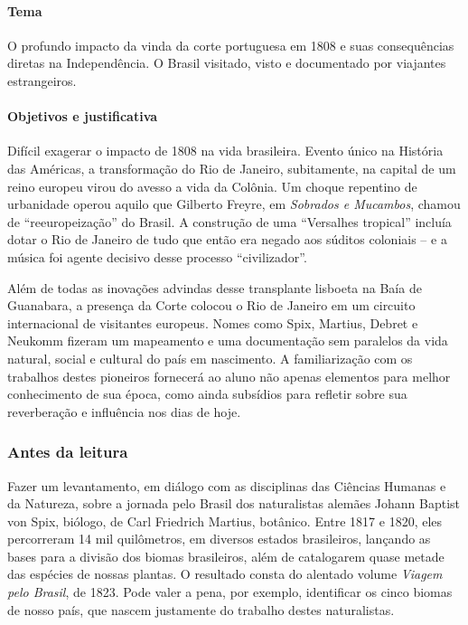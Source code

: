 \documentclass[11pt]{extarticle}
\begin{document}
\paragraph{Tema} O profundo impacto da vinda da corte portuguesa em 1808 e suas
consequências diretas na Independência. O Brasil visitado, visto e documentado
por viajantes estrangeiros. 

 

\paragraph{Objetivos e justificativa}

Difícil exagerar o impacto de 1808 na vida brasileira. Evento único na História
das Américas, a transformação do Rio de Janeiro, subitamente, na capital de um
reino europeu virou do avesso a vida da Colônia. Um choque repentino de
urbanidade operou aquilo que Gilberto Freyre, em \emph{Sobrados e Mucambos}, chamou de
“reeuropeização” do Brasil. A construção de uma “Versalhes tropical” incluía
dotar o Rio de Janeiro de tudo que então era negado aos súditos coloniais –  e
a música foi agente decisivo desse processo “civilizador”.

Além de todas as inovações advindas desse transplante lisboeta na Baía de
Guanabara, a presença da Corte colocou o Rio de Janeiro em um circuito
internacional de visitantes europeus. Nomes como Spix, Martius, Debret e
Neukomm fizeram um mapeamento e uma documentação sem paralelos da vida natural,
social e cultural do país em nascimento. A familiarização com os trabalhos
destes pioneiros fornecerá ao aluno não apenas elementos para melhor
conhecimento de sua época, como ainda subsídios para refletir sobre sua
reverberação e influência nos dias de hoje.

\subsubsection{Antes da leitura}

Fazer um levantamento, em diálogo com as disciplinas das Ciências Humanas e da Natureza, sobre a jornada pelo Brasil dos naturalistas alemães Johann
Baptist von Spix, biólogo, de Carl Friedrich Martius, botânico. Entre 1817 e
1820, eles percorreram 14 mil quilômetros, em diversos estados brasileiros,
lançando as bases para a divisão dos biomas brasileiros, além de catalogarem
quase metade das espécies de nossas plantas. O resultado consta do alentado
volume \emph{Viagem pelo Brasil}, de 1823. Pode valer a pena, por exemplo, identificar
os cinco biomas de nosso país, que nascem justamente do trabalho destes
naturalistas.
\end{document}
